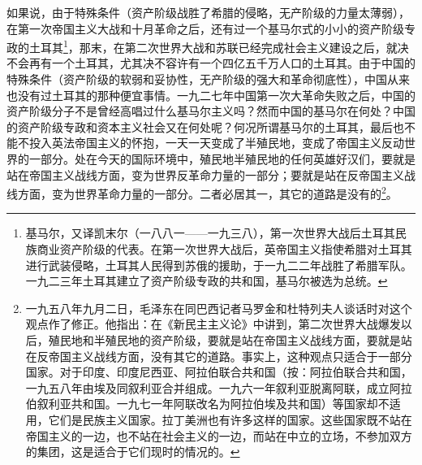 \documentclass[UTF8, 12pt, a4paper]{ctexrep}
\begin{document}
如果说，由于特殊条件（资产阶级战胜了希腊的侵略，无产阶级的力量太薄弱），在第一次帝国主义大战和十月革命之后，还有过一个基马尔式的小小的资产阶级专政的土耳其\footnote{基马尔，又译凯末尔（一八八一——一九三八），第一次世界大战后土耳其民族商业资产阶级的代表。在第一次世界大战后，英帝国主义指使希腊对土耳其进行武装侵略，土耳其人民得到苏俄的援助，于一九二二年战胜了希腊军队。一九二三年土耳其建立了资产阶级专政的共和国，基马尔被选为总统。}，那末，在第二次世界大战和苏联已经完成社会主义建设之后，就决不会再有一个土耳其，尤其决不容许有一个四亿五千万人口的土耳其。由于中国的特殊条件（资产阶级的软弱和妥协性，无产阶级的强大和革命彻底性），中国从来也没有过土耳其的那种便宜事情。一九二七年中国第一次大革命失败之后，中国的资产阶级分子不是曾经高唱过什么基马尔主义吗？然而中国的基马尔在何处？中国的资产阶级专政和资本主义社会又在何处呢？何况所谓基马尔的土耳其，最后也不能不投入英法帝国主义的怀抱，一天一天变成了半殖民地，变成了帝国主义反动世界的一部分。处在今天的国际环境中，殖民地半殖民地的任何英雄好汉们，要就是站在帝国主义战线方面，变为世界反革命力量的一部分；要就是站在反帝国主义战线方面，变为世界革命力量的一部分。二者必居其一，其它的道路是没有的\footnote{一九五八年九月二日，毛泽东在同巴西记者马罗金和杜特列夫人谈话时对这个观点作了修正。他指出：在《新民主主义论》中讲到，第二次世界大战爆发以后，殖民地和半殖民地的资产阶级，要就是站在帝国主义战线方面，要就是站在反帝国主义战线方面，没有其它的道路。事实上，这种观点只适合于一部分国家。对于印度、印度尼西亚、阿拉伯联合共和国（按：阿拉伯联合共和国，一九五八年由埃及同叙利亚合并组成。一九六一年叙利亚脱离阿联，成立阿拉伯叙利亚共和国。一九七一年阿联改名为阿拉伯埃及共和国）等国家却不适用，它们是民族主义国家。拉丁美洲也有许多这样的国家。这些国家既不站在帝国主义的一边，也不站在社会主义的一边，而站在中立的立场，不参加双方的集团，这是适合于它们现时的情况的。}。
\end{document}
